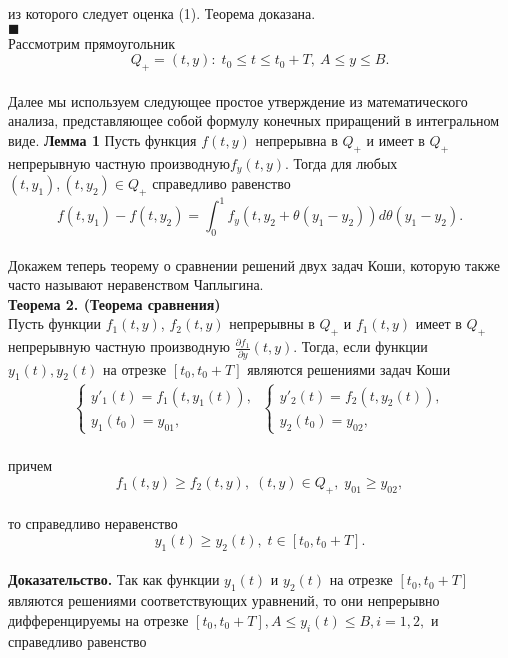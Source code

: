 из которого следует оценка (1). Теорема доказана. \\$\blacksquare$
\\
Рассмотрим прямоугольник
\begin{equation*}
Q_+={(t,y):\; t_0\leq t\leq t_0+T,\: A\leq y\leq B}.
\end{equation*}
\\
Далее мы используем следующее простое утверждение из математического анализа, представляющее собой формулу конечных приращений в интегральном виде.
\textbf{Лемма 1}
Пусть функция $f(t,y)$ непрерывна в $Q_+$ и имеет в $Q_+$ непрерывную частную производную$f_y(t,y)$. Тогда для любых $(t,y_1), (t,y_2)\in Q_+$ справедливо равенство
\begin{equation*}\tag{3}
f(t,y_1)-f(t,y_2)=\int_0^1 f_y(t,y_2+\theta(y_1-y_2))d\theta(y_1-y_2).
\end{equation*}\\
Докажем теперь теорему о сравнении решений двух задач Коши, которую также часто называют  неравенством Чаплыгина.
\\
\textbf{Теорема 2. (Теорема сравнения)}\\
Пусть функции $f_1(t,y)$, $f_2(t,y)$ непрерывны в $Q_+$ и $f_1(t,y)$ имеет в $Q_+$ непрерывную частную производную $\frac{\partial f_1}{\partial y}(t,y)$. Тогда, если функции $y_1(t), y_2(t)$ на отрезке $[t_0,t_0+T]$ являются решениями задач Коши
\begin{equation*}
\begin{split}
\begin{cases}
y'_1(t)=f_1(t,y_1(t)),\\
y_1(t_0)=y_{01},
\end{cases}
\:
\begin{cases}
y'_2(t)=f_2(t,y_2(t)),\\
y_2(t_0)=y_{02},
\end{cases}
\end{split}
\end{equation*}\\
причем
\begin{equation*}
f_1(t,y)\geq f_2(t,y), \;(t,y)\in Q_+, \;y_{01}\geq y_{02},
\end{equation*}\\
то справедливо неравенство
\begin{equation*}
y_1(t)\geq y_2(t),\; t\in [t_0,t_0+T].
\end{equation*}\\
\textbf{Доказательство.} Так как функции $y_1(t)$ и $y_2(t)$ на отрезке $[t_0,t_0+T]$ являются решениями соответствующих уравнений, то они непрерывно дифференцируемы на отрезке $[t_0,t_0+T], A \leq y_i(t) \leq B, i=1,2,$ и справедливо равенство
